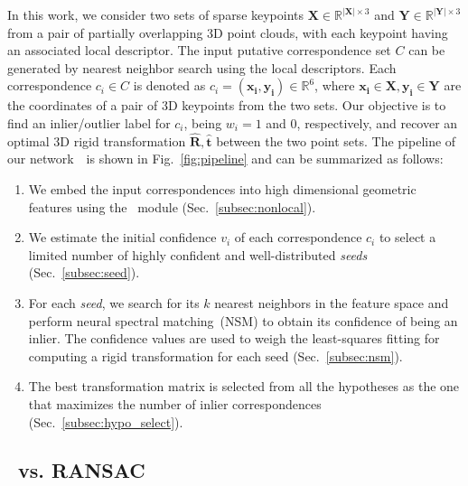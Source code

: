 In this work, we consider two sets of sparse keypoints $\mathbf{X} \in \mathbb{R}^{|\mathbf{X}|\times 3}$ and $\mathbf{Y} \in \mathbb{R}^{|\mathbf{Y}|\times 3}$ from a pair of partially overlapping 3D point clouds, {with each keypoint having} an associated local descriptor. 
The input putative correspondence set $C$ can be generated by nearest neighbor search using the local descriptors. Each correspondence ${c_i} \in {C}$ is denoted as ${c_i} = (\bm{x_i, y_{i}}) \in \mathbb{R}^6$, where $\bm{x_i}\in \mathbf{X}, \bm{y_{i}}\in \mathbf{Y}$ are the coordinates of {a pair of 3D keypoints from the two sets.}
{Our objective is to find an inlier/outlier label for $c_i$, being $w_i=1$ and $0$, respectively,}
and recover {an optimal 3D rigid} transformation $\mathbf{\hat R},\mathbf{\hat t}$ between the two point sets.
The pipeline of our network~\Name~is shown in Fig.~\ref{fig:pipeline} and can be summarized as follows:
\begin{enumerate}[itemsep=-1mm]
\item We embed the input correspondences into high dimensional geometric features using the \nonlocal~module
(Sec.~\ref{subsec:nonlocal}).
    \item We estimate the initial confidence $v_i$ of each correspondence $c_i$ to select a limited number of highly confident and well-distributed \textit{seeds} (Sec.~\ref{subsec:seed}).
\item For each \textit{seed}, we search for its $k$ nearest neighbors in the feature space and perform neural spectral matching~(NSM) to obtain {its} confidence {of} being an inlier. The confidence values are used to {weigh} the least-squares fitting for computing a rigid transformation for each seed (Sec.~\ref{subsec:nsm}). 


\item The best transformation matrix is selected from all the hypotheses as the one that maximizes the number of inlier correspondences (Sec.~\ref{subsec:hypo_select}).
\end{enumerate}






\subsection{\Name~vs. RANSAC}
\label{sec:vs_ransac}


